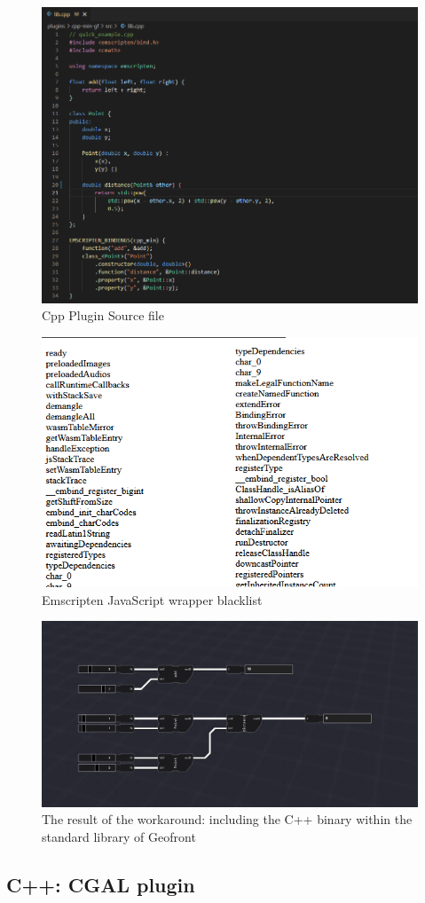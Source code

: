 \begin{figure}
  \graphicspath{{../../assets/images/6.1.3/}}
  \centering
  \includegraphics[width=0.50\linewidth]{source.PNG}
  \caption[loading a plugin]{Cpp Plugin Source file}
  \label{fig:min-cpp-source}
\end{figure}

\begin{figure}
  \graphicspath{{../../assets/images/6.1.3/}}
  \centering
  \includegraphics[width=0.50\linewidth]{blacklist.PNG}
  \caption[loading a plugin]{Emscripten JavaScript wrapper blacklist }
  \label{fig:min-cpp-whitelist}
\end{figure}

\begin{figure}
  \graphicspath{{../../assets/images/6.1.3/}}
  \centering
  \includegraphics[width=0.50\linewidth]{graph.PNG}
  \caption[loading a plugin]{The result of the workaround: including the C++ binary within the standard library of Geofront}
  \label{fig:min-cpp:workaround}
\end{figure}

\subsection{C++: CGAL plugin}

